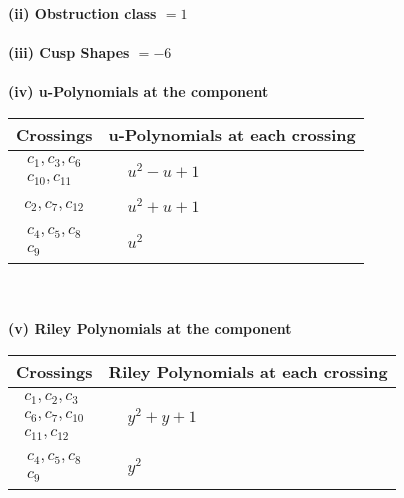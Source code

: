 \documentclass[1p]{elsarticle_modified}
\theoremstyle{definition}
\begin{document}
\flushleft \textbf{(ii) Obstruction class $= 1$}\\~\\
\flushleft \textbf{(iii) Cusp Shapes $= -6$}\\~\\
\newpage\renewcommand{\arraystretch}{1}
\flushleft \textbf{(iv) u-Polynomials at the component}\newline \\
\begin{tabular}{m{50pt}|m{274pt}}
Crossings & \hspace{64pt}u-Polynomials at each crossing \\
\hline $$\begin{aligned}c_{1},c_{3},c_{6}\\c_{10},c_{11}\end{aligned}$$&$\begin{aligned}
&u^2- u+1
\end{aligned}$\\
\hline $$\begin{aligned}c_{2},c_{7},c_{12}\end{aligned}$$&$\begin{aligned}
&u^2+u+1
\end{aligned}$\\
\hline $$\begin{aligned}c_{4},c_{5},c_{8}\\c_{9}\end{aligned}$$&$\begin{aligned}
&u^2
\end{aligned}$\\
\hline
\end{tabular}\\~\\
\newpage\renewcommand{\arraystretch}{1}
\flushleft \textbf{(v) Riley Polynomials at the component}\newline \\
\begin{tabular}{m{50pt}|m{274pt}}
Crossings & \hspace{64pt}Riley Polynomials at each crossing \\
\hline $$\begin{aligned}c_{1},c_{2},c_{3}\\c_{6},c_{7},c_{10}\\c_{11},c_{12}\end{aligned}$$&$\begin{aligned}
&y^2+y+1
\end{aligned}$\\
\hline $$\begin{aligned}c_{4},c_{5},c_{8}\\c_{9}\end{aligned}$$&$\begin{aligned}
&y^2
\end{aligned}$\\
\hline
\end{tabular}\\~\\
\end{document}
